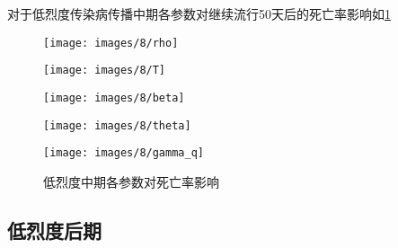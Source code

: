 \documentclass[withoutpreface,bwprint]{cumcmthesis}
\begin{document}
对于低烈度传染病传播中期各参数对继续流行50天后的死亡率影响如\cref{fig:13}
\begin{figure}[H]
    \centering
    \begin{minipage}[c]{0.3\textwidth}
        \centering
        \texttt{[image: images/8/rho]}
        \subcaption{$\rho$}
    \end{minipage}
    \begin{minipage}[c]{0.3\textwidth}
        \centering
        \texttt{[image: images/8/T]}
    \end{minipage}
    \begin{minipage}[c]{0.3\textwidth}
        \centering
        \texttt{[image: images/8/beta]}
        \subcaption{$\beta$}
    \end{minipage}

    \begin{minipage}[c]{0.3\textwidth}
        \centering
        \texttt{[image: images/8/theta]}
        \subcaption{$\theta$}
    \end{minipage}
    \begin{minipage}[c]{0.3\textwidth}
        \centering
        \texttt{[image: images/8/gamma\_q]}
    \end{minipage}
    \caption{低烈度中期各参数对死亡率影响}
    \label{fig:13}
    
\end{figure}

\subsection{低烈度后期}
\end{document}
